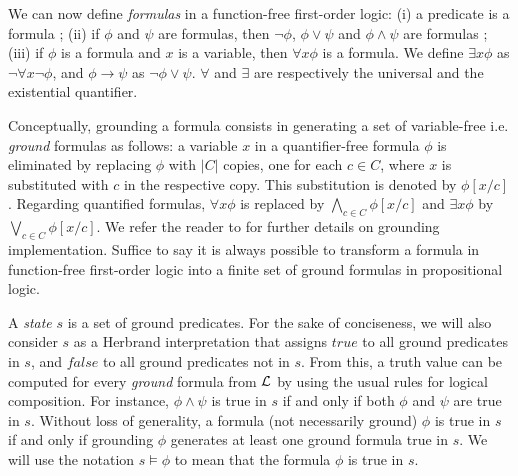 \documentclass[letterpaper]{article} %
\begin{document}
We can now define {\it formulas} in a function-free first-order logic: (i) a predicate is a formula ; (ii) if ${\phi}$ and ${\psi}$ are formulas, then $\neg \phi$, $\phi \vee \psi$ and $\phi \wedge \psi$ are formulas ; (iii) if $\phi$ is a formula and $x$ is a variable, then $\forall x \phi$ is a formula. We define $\exists x \phi$ as $\neg \forall x \neg \phi$, and $\phi \rightarrow \psi$ as $\neg \phi \vee \psi$. $\forall$ and $\exists$ are respectively the universal and the existential quantifier.

Conceptually, grounding a formula consists in generating a set of variable-free i.e. {\it ground} formulas \cite{helmert} as follows: a variable $x$ in a quantifier-free formula $\phi$ is eliminated by replacing $\phi$ with $|C|$ copies, one for each $c \in C$, where $x$ is substituted with $c$ in the respective copy. This substitution is denoted by $\phi[x/c]$. Regarding quantified formulas, $\forall x \phi$ is replaced by $\bigwedge_{c \in C} \phi[x/c]$ and $\exists x \phi$ by $\bigvee_{c \in C} \phi[x/c]$. We refer the reader to \cite{behnke20,ramoul17} for further details on grounding implementation. Suffice to say it is always possible to transform a formula in function-free first-order logic into a finite set of ground formulas in propositional logic.

A {\it state} $s$ is a set of ground predicates. For the sake of conciseness, we will also consider $s$ as a Herbrand interpretation that assigns $true$ to all ground predicates in $s$, and $false$ to all ground predicates not in $s$. From this, a truth value can be computed for every {\it ground} formula from ${\cal{L}}$ by using the usual rules for logical composition. For instance, $\phi \wedge \psi$ is true in $s$ if and only if both $\phi$ and $\psi$ are true in $s$. Without loss of generality, a formula (not necessarily ground) $\phi$ is true in $s$ if and only if grounding $\phi$ generates at least one ground formula true in $s$. We will use the notation $s \models \phi$ to mean that the formula $\phi$ is true in $s$.
\end{document}
